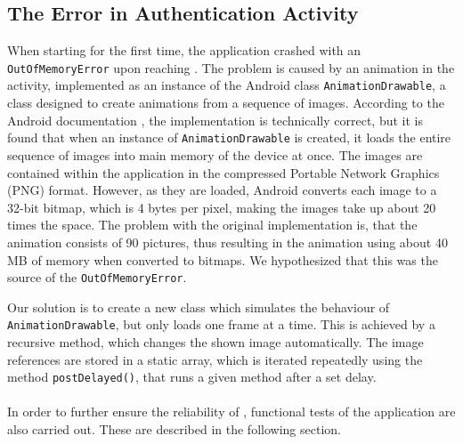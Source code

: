 \subsection{The Error in Authentication Activity}
When starting \launcher for the first time, the application crashed with an \lstinline{OutOfMemoryError} upon reaching \authenticationactivity.
The problem is caused by an animation in the activity, implemented as an instance of the Android class \lstinline{AnimationDrawable}, a class designed to create animations from a sequence of images.
According to the Android documentation \citet{androidreference}, the implementation is technically correct, but it is found that when an instance of \lstinline{AnimationDrawable} is created, it loads the entire sequence of images into main memory of the device at once.
The images are contained within the application in the compressed Portable Network Graphics (PNG) format.
However, as they are loaded, Android converts each image to a 32-bit bitmap, which is 4 bytes per pixel, making the images take up about 20 times the space.
The problem with the original implementation is, that the animation consists of 90 pictures, thus resulting in the animation using about 40 MB of memory when converted to bitmaps. 
We hypothesized that this was the source of the \lstinline{OutOfMemoryError}.

Our solution is to create a new class which simulates the behaviour of \lstinline{AnimationDrawable}, but only loads one frame at a time.
This is achieved by a recursive method, which changes the shown image automatically.
The image references are stored in a static array, which is iterated repeatedly using the method \lstinline|postDelayed()|, that runs a given method after a set delay.\\\\

In order to further ensure the reliability of \launcher, functional tests of the application are also carried out.
These are described in the following section.